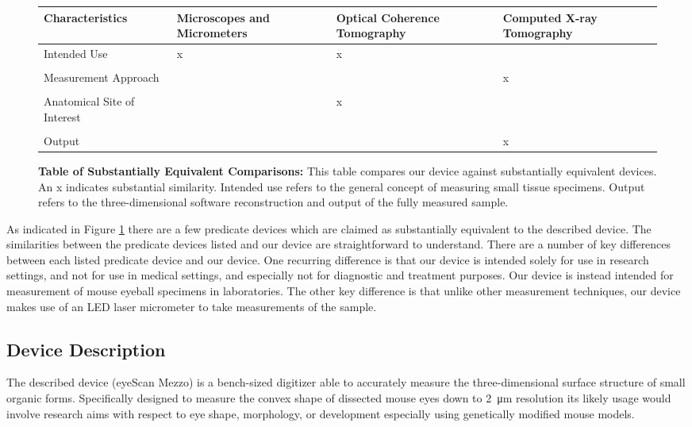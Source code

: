 \documentclass{article}
\begin{document}
\begin{figure}[H]
  \begin{tabularx}{\textwidth}{YYYY}
    \toprule
    Characteristics & \mbox{Microscopes} and \mbox{Micrometers} & Optical Coherence \mbox{Tomography} & Computed X-ray \mbox{Tomography} \\ 
    \hline
    Intended Use & x & x &  \\
    \\
    Measurement Approach &   &  & x \\ 
    \\
    Anatomical Site of Interest & & x &  \\
    \\
    Output & & & x \\
    \bottomrule
  \end{tabularx}
  \caption{\textbf{Table of Substantially Equivalent Comparisons:}
    This table compares our device against substantially equivalent
    devices. An x indicates substantial similarity. Intended use
    refers to the general concept of measuring small tissue
    specimens. Output refers to the three-dimensional software
    reconstruction and output of the fully measured sample.}
  \label{comparison}
\end{figure}

As indicated in Figure \ref{comparison} there are a few predicate
devices which are claimed as substantially equivalent to the described
device. The similarities between the predicate devices listed and our
device are straightforward to understand. There are a number of key
differences between each listed predicate device and our device. One
recurring difference is that our device is intended solely for use in
research settings, and not for use in medical settings, and especially
not for diagnostic and treatment purposes. Our device is instead
intended for measurement of mouse eyeball specimens in
laboratories. The other key difference is that unlike other
measurement techniques, our device makes use of an LED laser
micrometer to take measurements of the sample.

\newpage
\subsection{Device Description}

The described device (eyeScan Mezzo) is a bench-sized digitizer able
to accurately measure the three-dimensional surface structure of small
organic forms. Specifically designed to measure the convex shape of
dissected mouse eyes down to \SI{2}{\micro m} resolution its likely
usage would involve research aims with respect to eye shape,
morphology, or development especially using genetically modified mouse
models.
\end{document}
